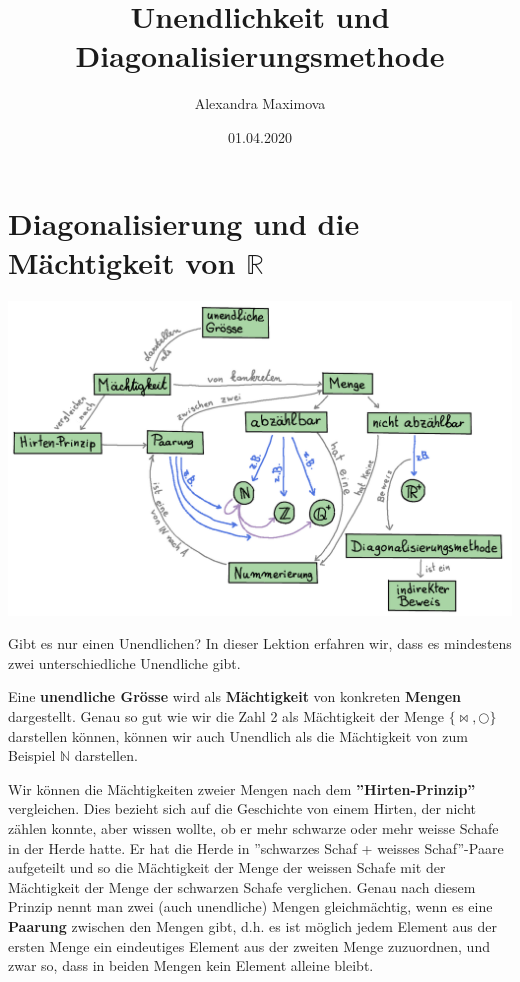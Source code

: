 \documentclass[
	12pt, %
	german, %
]{fphw}
\title{Unendlichkeit und Diagonalisierungsmethode} %
\author{Alexandra Maximova} %
\date{01.04.2020} %
\institute{ETH Zurich \\ Lehrdiplom Informatik} %
\newcommand{\keyword}[1]{\textbf{#1}}
\begin{document}
\maketitle %


\section*{Diagonalisierung und die Mächtigkeit von \(\mathbb{R}\)}

\begin{center}
	\includegraphics[width=\linewidth]{ConceptMap.png} %
\end{center}


Gibt es nur einen Unendlichen? In dieser Lektion erfahren wir, dass es mindestens zwei unterschiedliche Unendliche gibt.

Eine \keyword{unendliche Grösse} wird als \keyword{Mächtigkeit} von konkreten \keyword{Mengen} dargestellt. Genau so gut wie wir die Zahl 2 als Mächtigkeit der Menge \(\{\bowtie, \bigcirc\}\) darstellen können, können wir auch Unendlich als die Mächtigkeit von zum Beispiel \(\mathbb{N}\) darstellen.

Wir können die Mächtigkeiten zweier Mengen nach dem \keyword{''Hirten-Prinzip''} vergleichen. Dies bezieht sich auf die Geschichte von einem Hirten, der nicht zählen konnte, aber wissen wollte, ob er mehr schwarze oder mehr weisse Schafe in der Herde hatte. Er hat die Herde in ''schwarzes Schaf + weisses Schaf''-Paare aufgeteilt und so die Mächtigkeit der Menge der weissen Schafe mit der Mächtigkeit der Menge der schwarzen Schafe verglichen. Genau nach diesem Prinzip nennt man zwei (auch unendliche) Mengen gleichmächtig, wenn es eine \keyword{Paarung} zwischen den Mengen gibt, d.h. es ist möglich jedem Element aus der ersten Menge ein eindeutiges Element aus der zweiten Menge zuzuordnen, und zwar so, dass in beiden Mengen kein Element alleine bleibt.
\end{document}
